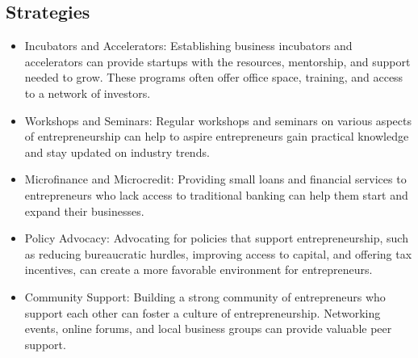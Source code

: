     \subsection {Strategies}
    \begin{itemize}
        \item Incubators and Accelerators: Establishing business incubators and accelerators can provide startups with the resources, mentorship, and support needed to grow. These programs often offer office space, training, and access to a network of investors.

        \item Workshops and Seminars: Regular workshops and seminars on various aspects of entrepreneurship can help to aspire entrepreneurs gain practical knowledge and stay updated on industry trends.

        \item Microfinance and Microcredit: Providing small loans and financial services to entrepreneurs who lack access to traditional banking can help them start and expand their businesses.

        \item Policy Advocacy: Advocating for policies that support entrepreneurship, such as reducing bureaucratic hurdles, improving access to capital, and offering tax incentives, can create a more favorable environment for entrepreneurs.

        \item Community Support: Building a strong community of entrepreneurs who support each other can foster a culture of entrepreneurship. Networking events, online forums, and local business groups can provide valuable peer support.
    \end{itemize}
